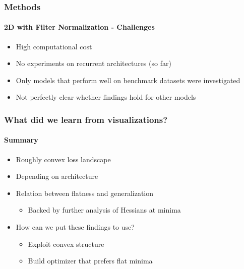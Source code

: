 \documentclass[9pt]{beamer}
\begin{document}


\begin{frame}
\frametitle{Methods}
\framesubtitle{2D with Filter Normalization - Challenges}
\begin{itemize}
	\item High computational cost
	\item No experiments on recurrent architectures (so far)
	\item Only models that perform well on benchmark datasets were investigated
	\item Not perfectly clear whether findings hold for other models %
\end{itemize}
\end{frame} 


\begin{frame}
\frametitle{What did we learn from visualizations?}
\framesubtitle{Summary}
\begin{itemize}%
	\item Roughly convex loss landscape
	\item Depending on architecture
	\item Relation between flatness and generalization
	\begin{itemize}
		\item Backed by further analysis of Hessians at minima
	\end{itemize}
	\item How can we put these findings to use?
	\begin{itemize}%
		\item Exploit convex structure
		\item Build optimizer that prefers flat minima
	\end{itemize}
\end{itemize}
\end{frame} 
\end{document}
